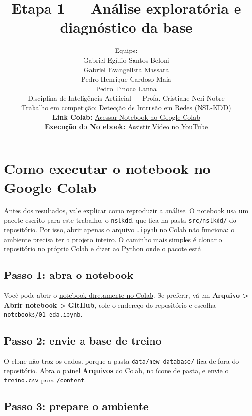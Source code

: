 \documentclass[11pt,a4paper]{article}
\title{Etapa 1 --- Análise exploratória e diagnóstico da base}
\author{Equipe:\\[2pt]
Gabriel Egídio Santos Beloni\\
Gabriel Evangelista Massara\\
Pedro Henrique Cardoso Maia\\
Pedro Tinoco Lanna\\[4pt]
\small Disciplina de Inteligência Artificial --- Profa. Cristiane Neri Nobre\\
\small Trabalho em competição: Detecção de Intrusão em Redes (NSL-KDD)\\[4pt]
\small \textbf{Link Colab:} \href{https://colab.research.google.com/drive/1wmBIFtCfOWC75ihG_dJpAMJjheCWAftz?usp=sharing}{Acessar Notebook no Google Colab}\\
\small \textbf{Execução do Notebook:} \href{https://youtu.be/Qd1Tmvogv-A}{Assistir Vídeo no YouTube}}
\date{}
\begin{document}
\maketitle

\tableofcontents
\clearpage
\section*{Como executar o notebook no Google Colab}

Antes dos resultados, vale explicar como reproduzir a análise. O notebook usa um pacote escrito para este trabalho, o \texttt{nslkdd}, que fica na pasta \texttt{src/nslkdd/} do repositório. Por isso, abrir apenas o arquivo \texttt{.ipynb} no Colab não funciona: o ambiente precisa ter o projeto inteiro. O caminho mais simples é clonar o repositório no próprio Colab e dizer ao Python onde o pacote está.

\begin{center}\end{center}

\subsection*{Passo 1: abra o notebook}

Você pode abrir o \href{https://colab.research.google.com/github/pedro-maia1337/IA-CopaLibertadores/blob/main/notebooks/01_eda.ipynb}{notebook diretamente no Colab}. Se preferir, vá em \textbf{Arquivo > Abrir notebook > GitHub}, cole o endereço do repositório e escolha \texttt{notebooks/01\_eda.ipynb}.

\subsection*{Passo 2: envie a base de treino}

O clone não traz os dados, porque a pasta \texttt{data/new-database/} fica de fora do repositório. Abra o painel \textbf{Arquivos} do Colab, no ícone de pasta, e envie o \texttt{treino.csv} para \texttt{/content}.

\subsection*{Passo 3: prepare o ambiente}
\end{document}
